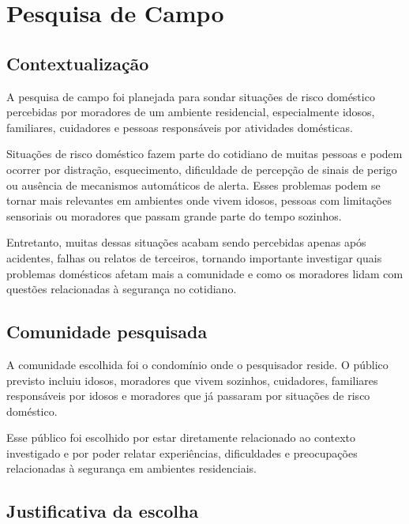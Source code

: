\documentclass[11pt,a4paper]{article}
\numberwithin{equation}{section}
\begin{document}
\vspace{0.6cm}

\tableofcontents
\newpage

\section{Pesquisa de Campo}
\label{cap:pesquisa}

\subsection{Contextualização}

A pesquisa de campo foi planejada para sondar situações de risco doméstico percebidas por moradores
de um ambiente residencial, especialmente idosos, familiares, cuidadores e pessoas responsáveis por
atividades domésticas.

Situações de risco doméstico fazem parte do cotidiano de muitas pessoas e podem ocorrer por
distração, esquecimento, dificuldade de percepção de sinais de perigo ou ausência de mecanismos
automáticos de alerta. Esses problemas podem se tornar mais relevantes em ambientes onde vivem
idosos, pessoas com limitações sensoriais ou moradores que passam grande parte do tempo sozinhos.

Entretanto, muitas dessas situações acabam sendo percebidas apenas após acidentes, falhas ou relatos
de terceiros, tornando importante investigar quais problemas domésticos afetam mais a comunidade e
como os moradores lidam com questões relacionadas à segurança no cotidiano.

\subsection{Comunidade pesquisada}

A comunidade escolhida foi o condomínio onde o pesquisador reside. O público previsto incluiu idosos,
moradores que vivem sozinhos, cuidadores, familiares responsáveis por idosos e moradores que já
passaram por situações de risco doméstico.

Esse público foi escolhido por estar diretamente relacionado ao contexto investigado e por poder
relatar experiências, dificuldades e preocupações relacionadas à segurança em ambientes residenciais.

\subsection{Justificativa da escolha}
\end{document}
